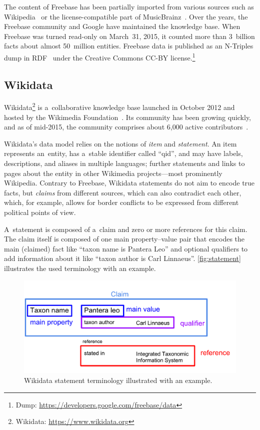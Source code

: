 \documentclass{sig-alternate-2013}
\begin{document}
The content of Freebase has been partially imported from various sources
such as Wikipedia~\cite{wikipedia-works} or
the license-compa\-tible part of MusicBrainz~\cite{musicbrainz}.
Over the years, the Freebase community and Google have maintained the knowledge base.
When Freebase was turned read-only on March~31, 2015,
it counted more than 3~billion facts about almost 50~million entities.
Freebase data is published as an N-Triples dump in RDF~\cite{rdf} under
the Creative Commons CC-BY license.\footnote{Dump: \url{https://developers.google.com/freebase/data}}

\subsection{Wikidata}

Wikidata\footnote{Wikidata: \url{https://www.wikidata.org}}
is a~collaborative knowledge base
launched in October 2012 and hosted by the Wikimedia Foundation~\cite{vrandevcic2014wikidata}.
Its community has been growing quickly, and as of mid-2015,
the community comprises about 6,000 active contributors~\cite{wikidatastats}.

Wikidata's data model relies on the notions of \emph{item} and \emph{statement}.
An item represents an~entity, has a~stable identifier called ``qid'', and may have labels,
descriptions, and aliases in multiple languages; further statements and links to pages
about the entity in other Wikimedia projects---most prominently Wikipedia.
Contrary to Freebase, Wikidata statements do not aim to encode true facts,
but \emph{claims} from different sources, which can also contradict each other,
which, for example, allows for border conflicts to be expressed
from different political points of view.

A~statement is composed of a~claim and zero or more references for this claim.
The claim itself is composed of one main property--value pair that encodes
the main (claimed) fact like ``taxon name is Pantera Leo'' and optional qualifiers
to add information about it like ``taxon author is Carl Linnaeus''.
\autoref{fig:statement} illustrates the used terminology with an example.

\begin{figure}[!htbp]
  \centering
  \includegraphics[width=8.45 cm]{img/wikidata-statement-schema.pdf}
  \caption{Wikidata statement terminology illustrated with an example.}
  \label{fig:statement}
\end{figure}
\end{document}
